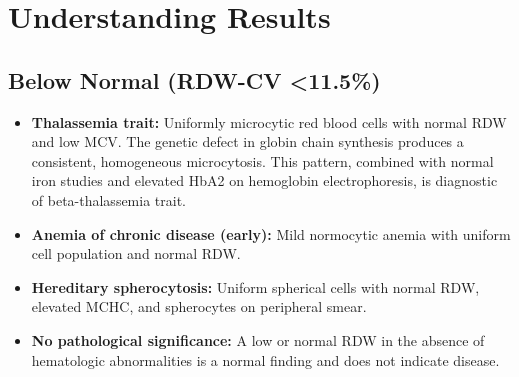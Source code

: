 \section*{Understanding Results}

\subsection*{Below Normal (RDW-CV <11.5\%)}
\begin{itemize}
  \item \textbf{Thalassemia trait:} Uniformly microcytic red blood cells with normal RDW and low MCV. The genetic defect in globin chain synthesis produces a consistent, homogeneous microcytosis. This pattern, combined with normal iron studies and elevated HbA2 on hemoglobin electrophoresis, is diagnostic of beta-thalassemia trait.
  \item \textbf{Anemia of chronic disease (early):} Mild normocytic anemia with uniform cell population and normal RDW.
  \item \textbf{Hereditary spherocytosis:} Uniform spherical cells with normal RDW, elevated MCHC, and spherocytes on peripheral smear.
  \item \textbf{No pathological significance:} A low or normal RDW in the absence of hematologic abnormalities is a normal finding and does not indicate disease.
\end{itemize}

